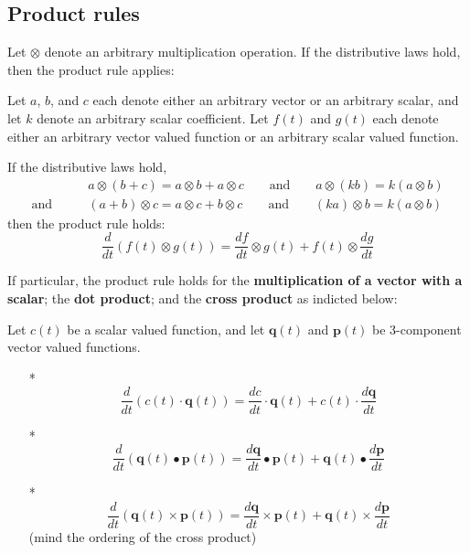 \documentclass{article}
\begin{document}
\subsection*{Product rules}

Let \(\otimes\) denote an arbitrary multiplication operation. If the distributive laws hold, then the product rule applies:

Let \(a\), \(b\), and \(c\) each denote either an arbitrary vector or an arbitrary scalar, and let \(k\) denote an arbitrary scalar coefficient. Let \(f(t)\) and \(g(t)\) each denote either an arbitrary vector valued function or an arbitrary scalar valued function. 

If the distributive laws hold,
\begin{align*}
& a \otimes (b + c) = a \otimes b + a \otimes c \quad\quad\text{and}\quad\quad a \otimes (k b) = k(a \otimes b)  \\
\text{and}\quad\quad & (a + b) \otimes c = a \otimes c + b \otimes c \quad\quad\text{and}\quad\quad (k a) \otimes b = k(a \otimes b)
\end{align*}
then the product rule holds:
\[\frac{d}{dt}(f(t) \otimes g(t)) = \frac{df}{dt} \otimes g(t) + f(t) \otimes \frac{dg}{dt}\]

If particular, the product rule holds for the {\bf multiplication of a vector with a scalar}; the {\bf dot product}; and the {\bf cross product} as indicted below: 

Let \(c(t)\) be a scalar valued function, and let \(\mathbf{q}(t)\) and \(\mathbf{p}(t)\) be 3-component vector valued functions.
\begin{itemize}
\item[*] \[\frac{d}{dt}(c(t) \cdot \mathbf{q}(t)) = \frac{dc}{dt} \cdot \mathbf{q}(t) + c(t) \cdot \frac{d\mathbf{q}}{dt}\]
\item[*] \[\frac{d}{dt}(\mathbf{q}(t) \bullet \mathbf{p}(t)) = \frac{d\mathbf{q}}{dt} \bullet \mathbf{p}(t) + \mathbf{q}(t) \bullet \frac{d\mathbf{p}}{dt}\]
\item[*] \[\frac{d}{dt}(\mathbf{q}(t) \times \mathbf{p}(t)) = \frac{d\mathbf{q}}{dt} \times \mathbf{p}(t) + \mathbf{q}(t) \times \frac{d\mathbf{p}}{dt}\] 
(mind the ordering of the cross product)
\end{itemize}
\end{document}
